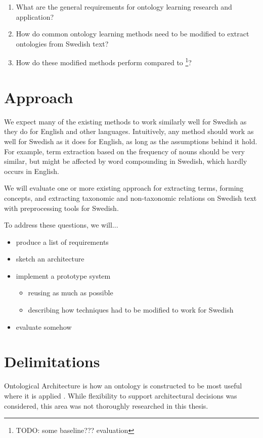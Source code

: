 \documentclass[a4paper]{report}
\newcommand{\todo}[1]{\footnote{{\color{red} TODO: #1}}}
\begin{document}
\begin{enumerate}
  \item{What are the general requirements for ontology learning research and application?}
  \item{How do common ontology learning methods need to be modified to extract ontologies from Swedish text?}
  \item{How do these modified methods perform compared to \todo{some baseline??? evaluation}?}
\end{enumerate}

\section{Approach}

We expect many of the existing methods to work similarly well for Swedish as they do for English and other languages.
Intuitively, any method should work as well for Swedish as it does for English, as long as the assumptions behind it hold.
For example, term extraction based on the frequency of nouns should be very similar, but might be affected by word compounding in Swedish, which hardly occurs in English.

We will evaluate one or more existing approach for extracting terms, forming concepts, and extracting taxonomic and non-taxonomic relations on Swedish text with preprocessing tools for Swedish.


To address these questions, we will...

\begin{itemize}
  \item produce a list of requirements
  \item sketch an architecture
  \item implement a prototype system
    \begin{itemize}
      \item reusing as much as possible
      \item describing how techniques had to be modified to work for Swedish
    \end{itemize}
  \item evaluate somehow
\end{itemize}

\section{Delimitations}

Ontological Architecture is how an ontology is constructed to be most useful where it is applied \cite{OntArchChapter}. While flexibility to support architectural decisions was considered, this area was not thoroughly researched in this thesis.
\end{document}
